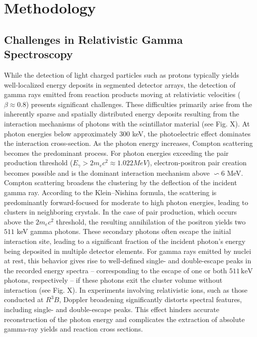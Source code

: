 \documentclass[final,5p,times,twocolumn]{elsarticle}
\begin{document}
\section{Methodology}
\label{sec:metho}
\subsection{Challenges in Relativistic Gamma Spectroscopy}\label{s_sec:gamma_spec}
While the detection of light charged particles such as protons typically yields well-localized energy deposits in segmented detector arrays, the detection of gamma rays emitted from reaction products moving at relativistic velocities ($\beta \approx 0.8$) presents significant challenges. These difficulties primarily arise from the inherently sparse and spatially distributed energy deposits resulting from the interaction mechanisms of photons with the scintillator material (see Fig. X).\newline
At photon energies below approximately $300$ keV, the photoelectric effect dominates the interaction cross-section. As the photon energy increases, Compton scattering becomes the predominant process. For photon energies exceeding the pair production threshold ($E_{\gamma} > 2m_{e}c^2 \approx 1.022 MeV$), electron-positron pair creation becomes possible and is the dominant interaction mechanism above $\backsim 6$ MeV.\newline
Compton scattering broadens the clustering by the deflection of the incident gamma ray. According to the Klein–Nishina formula, the scattering is predominantly forward-focused for moderate to high photon energies, leading to clusters in neighboring crystals.\newline
In the case of pair production, which occurs above the $2m_ec^2$ threshold, the resulting annihilation of the positron yields two $511$ keV gamma photons. These secondary photons often escape the initial interaction site, leading to a significant fraction of the incident photon’s energy being deposited in multiple detector elements.\newline
For gamma rays emitted by nuclei at rest, this behavior gives rise to well-defined single- and double-escape peaks in the recorded energy spectra -- corresponding to the escape of one or both $511\,\mathrm{keV}$ photons, respectively -- if these photons exit the cluster volume without interaction (see Fig. X).\newline
In experiments involving relativistic ions, such as those conducted at $R^3B$, Doppler broadening significantly distorts spectral features, including single- and double-escape peaks. This effect hinders accurate reconstruction of the photon energy and complicates the extraction of absolute gamma-ray yields and reaction cross sections.
\end{document}
